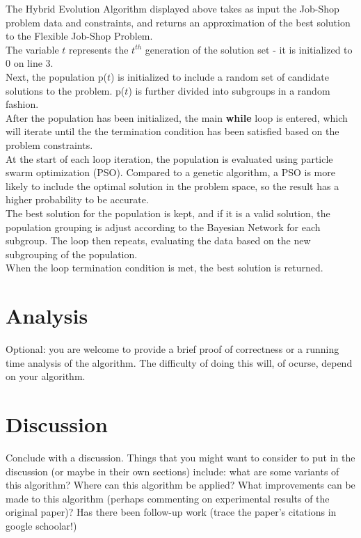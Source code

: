 \documentclass[11pt]{article}
\begin{document}
The Hybrid Evolution Algorithm displayed above takes as input the Job-Shop problem data and constraints, and returns an approximation of the best solution to the Flexible Job-Shop Problem.\\

The variable $t$ represents the $t^{th}$ generation of the solution set - it is initialized to 0 on line 3.\\

Next, the population p($t$) is initialized to include a random set of candidate solutions to the problem. p($t$) is further divided into subgroups in a random fashion.\\

After the population has been initialized, the main \textbf{while} loop is entered, which will iterate until the the termination condition has been satisfied based on the problem constraints.\\

At the start of each loop iteration, the population is evaluated using particle swarm optimization (PSO). Compared to a genetic algorithm, a PSO is more likely to include the optimal solution in the problem space, so the result has a higher probability to be accurate\cite{sun2015bayesian}.\\

The best solution for the population is kept, and if it is a valid solution, the population grouping is adjust according to the Bayesian Network for each subgroup. The loop then repeats, evaluating the data based on the new subgrouping of the population.\\

When the loop termination condition is met, the best solution is returned.





\section{Analysis}
Optional: you are welcome to provide a brief proof of correctness or a 
running time analysis of the algorithm.  The difficulty of doing this will, of 
ocurse, depend on your algorithm.

\section{Discussion}
Conclude with a discussion.  Things that you might want to consider to put in 
the discussion (or maybe in their own sections) include: what are some variants 
of this algorithm? Where can this algorithm be applied?  What improvements can 
be made to this algorithm (perhaps commenting on experimental results of the 
original paper)?  Has there been follow-up work (trace the paper's citations in 
google schoolar!)
\end{document}
